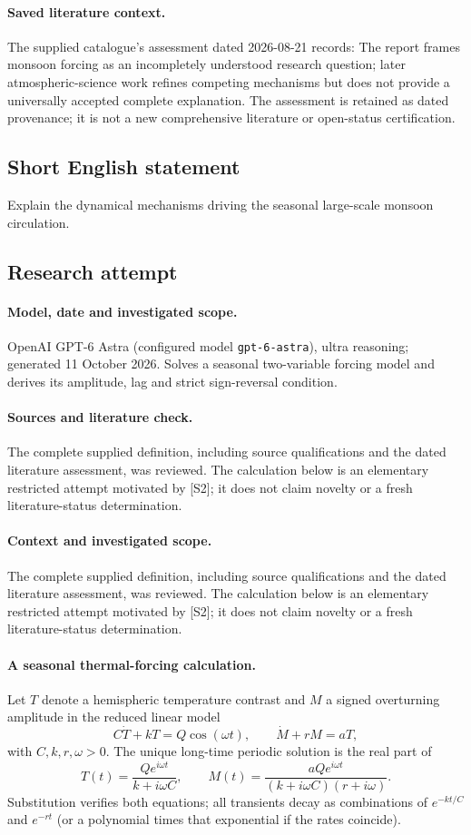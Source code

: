 \documentclass[11pt]{article}
\begin{document}
\paragraph{Saved literature context.} The supplied catalogue's assessment dated 2026-08-21 records: The report frames monsoon forcing as an incompletely understood research question; later atmospheric-science work refines competing mechanisms but does not provide a universally accepted complete explanation. The assessment is retained as dated provenance; it is not a new comprehensive literature or open-status certification.
\subsection{Short English statement}
Explain the dynamical mechanisms driving the seasonal large-scale monsoon circulation.
\subsection{Research attempt}
\paragraph{Model, date and investigated scope.}
OpenAI GPT-6 Astra (configured model \texttt{gpt-6-astra}), ultra reasoning; generated 11 October 2026. Solves a seasonal two-variable forcing model and derives its amplitude, lag and strict sign-reversal condition.

\paragraph{Sources and literature check.}
The complete supplied definition, including source qualifications and the dated literature assessment, was reviewed. The calculation below is an elementary restricted attempt motivated by [S2]; it does not claim novelty or a fresh literature-status determination.

\paragraph{Context and investigated scope.} The complete supplied definition, including source qualifications and the dated literature assessment, was reviewed. The calculation below is an elementary restricted attempt motivated by [S2]; it does not claim novelty or a fresh literature-status determination.

\paragraph{A seasonal thermal-forcing calculation.} Let $T$ denote a hemispheric temperature contrast and $M$ a signed overturning amplitude in the reduced linear model
\[
 C\dot T+kT=Q\cos(\omega t),\qquad \dot M+rM=aT,
\]
with $C,k,r,\omega>0$. The unique long-time periodic solution is the real part of
\[
 T(t)=\frac{Qe^{i\omega t}}{k+i\omega C},\qquad
 M(t)=\frac{aQe^{i\omega t}}{(k+i\omega C)(r+i\omega)}.
\]
Substitution verifies both equations; all transients decay as combinations of $e^{-kt/C}$ and $e^{-rt}$ (or a polynomial times that exponential if the rates coincide).
\end{document}
